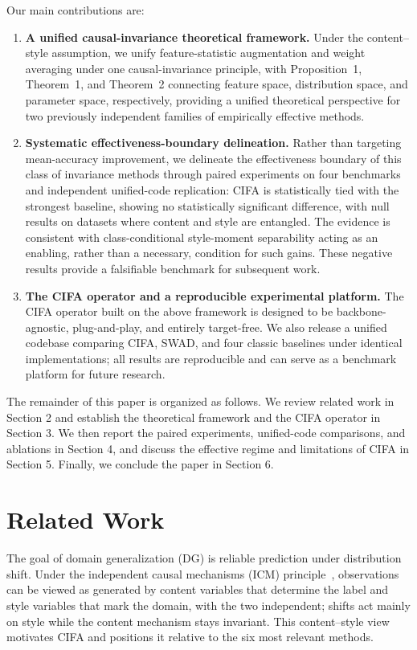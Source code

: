 \documentclass[electronics,article,submit,moreauthors]{Definitions/mdpi}
\newcommand{\add}[1]{\textcolor{addblue}{#1}}
\newcommand{\del}[1]{\textcolor{delred}{\st{#1}}}
\def\add#1{#1}
\def\del#1{}
\begin{document}
Our main contributions are:
\begin{enumerate}
\item \textbf{A unified causal-invariance theoretical framework.} Under the content--style assumption, we unify feature-statistic augmentation and weight averaging under one causal-invariance principle, with Proposition~1, Theorem~1, and Theorem~2 connecting feature space, distribution space, and parameter space, respectively, providing a unified theoretical perspective for two previously independent families of empirically effective methods.
\item \textbf{Systematic \del{validity}\add{effectiveness}-boundary delineation.} Rather than targeting mean-accuracy improvement, we delineate the effectiveness boundary of this class of invariance methods through paired experiments on four benchmarks and independent unified-code replication: CIFA is \del{statistically equivalent to}\add{statistically tied with} the strongest baseline\add{, showing no statistically significant difference}, with null results on datasets where content and style are entangled. The evidence is consistent with class-conditional style-moment separability acting as an enabling, rather than a necessary, condition for such gains. These negative results provide a falsifiable benchmark for subsequent work.
\item \textbf{The CIFA operator and a reproducible experimental platform.} The CIFA operator built on the above framework is designed to be backbone-agnostic, plug-and-play, and entirely target-free. We also release a unified codebase comparing CIFA, SWAD, and four classic baselines under identical implementations; all results are reproducible and can serve as a benchmark platform for future research.
\end{enumerate}

The remainder of this paper is organized as follows. We review related work in Section 2 and establish the theoretical framework and the CIFA operator in Section 3. We then report the paired experiments, unified-code comparisons, and ablations in Section 4, and discuss the effective regime and limitations of CIFA in Section 5. Finally, we conclude the paper in Section 6.

\section{Related Work}

The goal of domain generalization (DG) is reliable prediction under distribution shift. Under the independent causal mechanisms (ICM) principle~\citep{ref5,ref6}, observations can be viewed as generated by content variables that determine the label and style variables that mark the domain, with the two independent; shifts act mainly on style while the content mechanism stays invariant. This content--style view motivates CIFA and positions it relative to the six most relevant methods.
\end{document}
